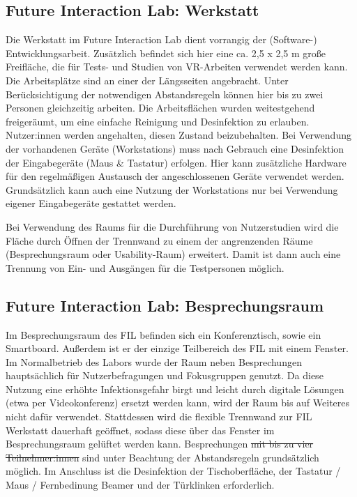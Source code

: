 \subsection{Future Interaction Lab: Werkstatt}\label{subsec:labore_fil_werkstatt}


\noindent
Die Werkstatt im Future Interaction Lab dient vorrangig der (Software-) Entwicklungsarbeit.
Zusätzlich befindet sich hier eine ca.
2,5 x 2,5 m große Freifläche, die für Tests- und Studien von VR-Arbeiten verwendet werden kann.
Die Arbeitsplätze sind an einer der Längsseiten angebracht. Unter Berücksichtigung der notwendigen Abstandsregeln können hier bis zu zwei Personen gleichzeitig arbeiten.
Die Arbeitsflächen wurden weitestgehend freigeräumt, um eine einfache Reinigung und Desinfektion zu erlauben.
Nutzer:innen werden angehalten, diesen Zustand beizubehalten.
Bei Verwendung der vorhandenen Geräte (Workstations) muss nach Gebrauch eine Desinfektion der Eingabegeräte (Maus \& Tastatur) erfolgen.
Hier kann zusätzliche Hardware für den regelmäßigen Austausch der angeschlossenen Geräte verwendet werden.
Grundsätzlich kann auch eine Nutzung der Workstations nur bei Verwendung eigener Eingabegeräte gestattet werden.

\medskip
\noindent
Bei Verwendung des Raums für die Durchführung von Nutzerstudien wird die Fläche durch Öffnen der Trennwand zu einem der angrenzenden Räume (Besprechungsraum oder Usability-Raum) erweitert.
Damit ist dann auch eine Trennung von Ein- und Ausgängen für die Testpersonen möglich.

\subsection{Future Interaction Lab: Besprechungsraum}\label{subsec:labore_fil_besprechungsraum}


\noindent
Im Besprechungsraum des FIL befinden sich ein Konferenztisch, sowie ein Smartboard.
Außerdem ist er der einzige Teilbereich des FIL mit einem Fenster.
Im Normalbetrieb des Labors wurde der Raum neben Besprechungen hauptsächlich für Nutzerbefragungen und Fokusgruppen genutzt.
Da diese Nutzung eine erhöhte Infektionsgefahr birgt und leicht durch digitale Lösungen (etwa per Videokonferenz) ersetzt werden kann, wird der Raum bis auf Weiteres nicht dafür verwendet.
Stattdessen wird die flexible Trennwand zur FIL Werkstatt dauerhaft geöffnet, sodass diese über das Fenster im Besprechungsraum gelüftet werden kann.
Besprechungen \sout{mit bis zu vier Teilnehmer:innen} sind unter Beachtung der Abstandsregeln grundsätzlich möglich.
Im Anschluss ist die Desinfektion der Tischoberfläche, der Tastatur / Maus / Fernbedinung Beamer und der Türklinken erforderlich.

